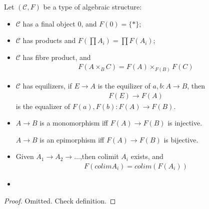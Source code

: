 \documentclass[Total.tex]{subfiles}
\begin{document}
					\begin{lemma}\label{Sheaves-Sheaves-Properties-of-Algebraic-Structure-1}
						Let $(\mathcal{C},F)$ be a type of algebraic structure:
						\begin{itemize}
							\item $\mathcal{C}$ has a final object $0$, and $F(0)=\{*\}$;
							\item $\mathcal{C}$ has products and $F(\prod A_i)=\prod F(A_i)$;
							\item $\mathcal{C}$ has fibre product, and 
							\begin{gather*}
								F(A\times_B C)=F(A)\times_{F(B)} F(C)
							\end{gather*}
							\item $\mathcal{C}$ has equilizers, if $E\rightarrow A$ is the equilizer of $a,b:A\rightarrow B$, then
							\begin{gather*}
								F(E)\rightarrow F(A)
							\end{gather*}
							is the equalizer of $F(a),F(b):F(A)\rightarrow F(B)$.
							\item $A\rightarrow B$ is a monomorphism iff $F(A)\rightarrow F(B)$ is injective.
							
							$A\rightarrow B$ is an epimorphism iff $F(A)\rightarrow F(B)$ is bijective.
							\item Given $A_1\rightarrow A_2\rightarrow \dots$,then colimit $A_i$ exists, and 
							\begin{gather*}
								F(colim A_i)=colim(F(A_i))
							\end{gather*}
							\item 	
						\end{itemize}
					\end{lemma}
					\begin{proof}
						Omitted. Check definition.
					\end{proof}
					
\end{document}
